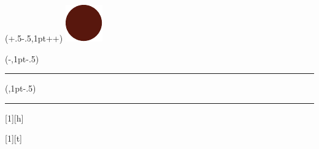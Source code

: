 {\begin{textblock*}{\hbNotePS}
  \end{textblock*}%
  \begin{textblock*}{\hbNotePS}(\hbNoteBoxWidth+.5\hbNoteRW-.5\hbNotePS,1pt+\hbNoteBoxHeight+\hbNoteBoxDepth)
  \includegraphics[width=\hbNotePS,height=\hbNotePS]{assets/note-var-corner}
  \end{textblock*}%
  \begin{textblock*}{\hbNoteRW}(-\hbNoteRW,1pt-.5\hbNotePS)
  {\color{chapter}\rule{\hbNoteRW}{\hbNoteBoxHeight+\hbNoteBoxDepth+\hbNotePS}}
  \end{textblock*}%
  \begin{textblock*}{\hbNoteRW}(\hbNoteBoxWidth,1pt-.5\hbNotePS)
  {\color{chapter}\rule{\hbNoteRW}{\hbNoteBoxHeight+\hbNoteBoxDepth+\hbNotePS}}
  \end{textblock*}%
  \usebox{\hbNoteBox}\hspace*{\hbNoteRW}%
}

[1][h]{%
\hbNoteBefore%
\begin{figure}[#1]%
  \hbNoteDrawVar%
\end{figure}%
\hbNoteAfter%
}

[1][t]{%
\hbNoteBefore%
\begin{figure}[#1]%
  \hbNoteDrawVar%
\end{figure}%
\hbNoteAfter%
}


